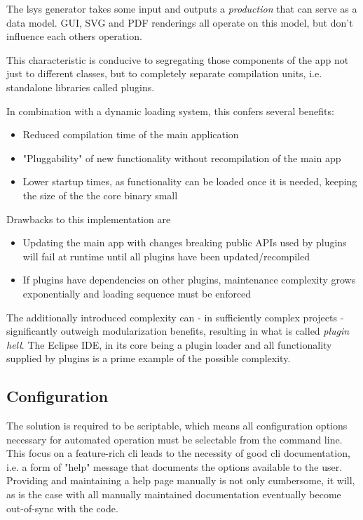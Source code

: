 The \gls{lsys} generator takes some input and outputs a \textit{production} that can serve as a data model. GUI, SVG and PDF renderings all operate on this model, but don't influence each others operation.

This characteristic is conducive to segregating those components of the app not just to different classes, but to completely separate compilation units, i.e. standalone libraries called plugins.

In combination with a dynamic loading system, this confers several benefits:

\begin{itemize}
	\item  Reduced compilation time of the main application
	\item  "Pluggability" of new functionality without recompilation of the main app
	\item  Lower startup times, as functionality can be loaded once it is needed, keeping the size of the the core binary small
\end{itemize}

Drawbacks to this implementation are
\begin{itemize}
	\item Updating the main app with changes breaking public APIs used by plugins will fail at runtime until all plugins have been updated/recompiled
	\item If plugins have dependencies on other plugins, maintenance complexity grows exponentially and loading sequence must be enforced
\end{itemize}

The additionally introduced complexity can - in sufficiently complex projects - significantly outweigh modularization benefits, resulting in what is called \textit{plugin hell}.
The Eclipse IDE, in its core being a plugin loader and all functionality supplied by plugins is a prime example of the possible complexity.



\subsection{Configuration}
The solution is required to be scriptable, which means all configuration options necessary for automated operation must be selectable from the command line.
This focus on a feature-rich \gls{cli} leads to the necessity of good \gls{cli} documentation, i.e. a form of "help" message that documents the options available to the user.
Providing and maintaining a help page manually is not only cumbersome, it will, as is the case with all manually maintained documentation eventually become out-of-sync with the code.

